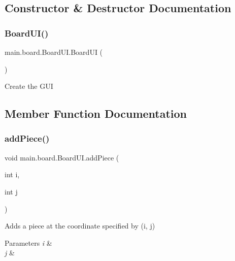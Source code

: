 \subsection{Constructor \& Destructor Documentation}
\hypertarget{classmain_1_1board_1_1_board_u_i_a1c893cdd0650369b92f7a4d9b2efe06e}{}\label{classmain_1_1board_1_1_board_u_i_a1c893cdd0650369b92f7a4d9b2efe06e} 
\subsubsection{\texorpdfstring{Board\+U\+I()}{BoardUI()}}
{\footnotesize\ttfamily main.\+board.\+Board\+U\+I.\+Board\+UI (\begin{DoxyParamCaption}{ }\end{DoxyParamCaption})}

Create the G\+UI 

\subsection{Member Function Documentation}
\hypertarget{classmain_1_1board_1_1_board_u_i_a24a259e0290230e1af5009d8dbfeb9c0}{}\label{classmain_1_1board_1_1_board_u_i_a24a259e0290230e1af5009d8dbfeb9c0} 
\subsubsection{\texorpdfstring{add\+Piece()}{addPiece()}}
{\footnotesize\ttfamily void main.\+board.\+Board\+U\+I.\+add\+Piece (\begin{DoxyParamCaption}\item[{int}]{i,  }\item[{int}]{j }\end{DoxyParamCaption})}

Adds a piece at the coordinate specified by (i, j) 
\begin{DoxyParams}{Parameters}
{\em i} & \\
\hline
{\em j} & \\
\hline
\end{DoxyParams}
\hypertarget{classmain_1_1board_1_1_board_u_i_aa762351c28dc367d2c18204f9ef5cf5e}{}\label{classmain_1_1board_1_1_board_u_i_aa762351c28dc367d2c18204f9ef5cf5e} 
